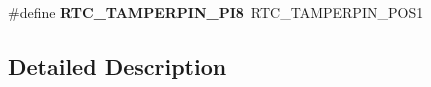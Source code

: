\begin{DoxyCompactItemize}
\item 
\#define {\bfseries R\+T\+C\+\_\+\+T\+A\+M\+P\+E\+R\+P\+I\+N\+\_\+\+P\+I8}~R\+T\+C\+\_\+\+T\+A\+M\+P\+E\+R\+P\+I\+N\+\_\+\+P\+O\+S1\hypertarget{group___h_a_l___r_t_c___aliased___defines_ga281fbac5fa3ba4677a329635519f2bb5}{}\label{group___h_a_l___r_t_c___aliased___defines_ga281fbac5fa3ba4677a329635519f2bb5}

\end{DoxyCompactItemize}


\subsection{Detailed Description}

